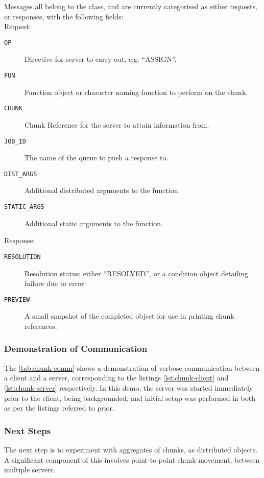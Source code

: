 Messages all belong to the  class, and are currently categorised as either requests, or responses, with the following fields:\\

Request: \begin{description} \item[\texttt{OP}] Directive for server to carry out, e.g. ``ASSIGN''.
	\item[\texttt{FUN}] Function object or character naming function to
		perform on the chunk.
	\item[\texttt{CHUNK}] Chunk Reference for the server to attain
		information from.
	\item[\texttt{JOB\_ID}] The name of the queue to push a response to.
	\item[\texttt{DIST\_ARGS}] Additional distributed arguments to the
		function.
	\item[\texttt{STATIC\_ARGS}] Additional static arguments to the
		function.
\end{description}

Response: \begin{description} \item[\texttt{RESOLUTION}] Resolution status; either ``RESOLVED'', or a condition object detailing failure due to error.
	\item[\texttt{PREVIEW}]  A small snapshot of the completed object for
		use in printing chunk references.
\end{description}

\subsubsection{Demonstration of Communication}

The \cref{tab:chunk-comm} shows a demonstration of verbose communication between a client and a server, corresponding to the listings \cref{lst:chunk-client} and \cref{lst:chunk-server} respectively.
In this demo, the server was started immediately prior to the client, being backgrounded, and initial setup was performed in both as per the listings referred to prior.



\subsubsection{Next Steps}

The next step is to experiment with aggregates of chunks, as distributed objects.
A significant component of this involves point-to-point chunk movement, between multiple servers.
